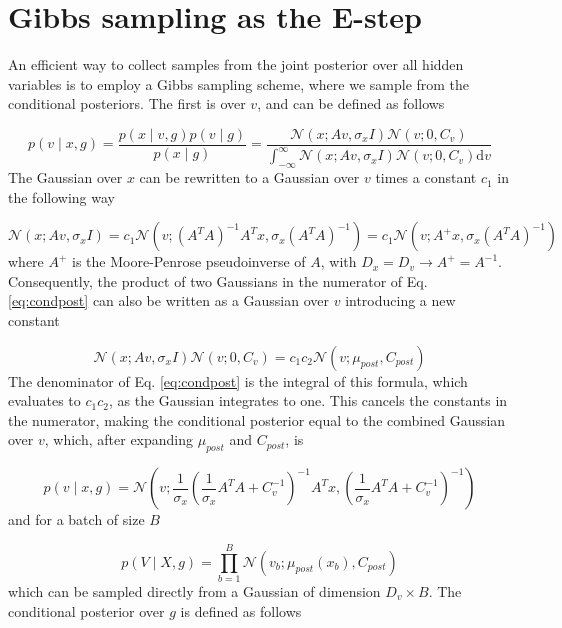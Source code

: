 \documentclass{paper}
\begin{document}
\section{Gibbs sampling as the E-step} \label{sec:estep}

An efficient way to collect samples from the joint posterior over all hidden variables is to employ a Gibbs sampling scheme, where we sample from the conditional posteriors. The first is over $v$, and can be defined as follows

\begin{equation} \label{eq:condpost}
p(v \mid x,g) = \frac{p(x \mid v,g) p(v \mid g)}{p(x \mid g)} = \frac{\mathcal{N}(x;Av,\sigma_x I) \mathcal{N}(v;0,C_v)}{\int_{-\infty}^{\infty} \mathcal{N}(x;Av,\sigma_x I) \mathcal{N}(v;0,C_v) \mathrm{d}v}
\end{equation}
%
The Gaussian over $x$ can be rewritten to a Gaussian over $v$ times a constant $c_1$ in the following way

\begin{equation} \label{eq:gauss_rewrite1}
\mathcal{N}(x;Av,\sigma_x I) = c_1 \mathcal{N}(v; (A^T A)^{-1} A^T x, \sigma_x (A^T A)^{-1}) = c_1 \mathcal{N}(v; A^{+} x, \sigma_x (A^T A)^{-1})
\end{equation}
%
where $A^{+}$ is the Moore-Penrose pseudoinverse of $A$, with $D_x = D_v \rightarrow A^{+} = A^{-1}$. Consequently, the product of two Gaussians in the numerator of Eq. \ref{eq:condpost} can also be written as a Gaussian over $v$ introducing a new constant

\begin{equation} \label{eq:gauss_rewrite2}
\mathcal{N}(x;Av,\sigma_x I) \mathcal{N}(v;0,C_v) = c_1 c_2 \mathcal{N}(v; \mu_{post},C_{post})
\end{equation}
%
The denominator of Eq. \ref{eq:condpost} is the integral of this formula, which evaluates to $c_1c_2$, as the Gaussian integrates to one. This cancels the constants in the numerator, making the conditional posterior equal to the combined Gaussian over $v$, which, after expanding $\mu_{post}$ and $C_{post}$, is

\begin{equation}
p(v \mid x,g) = \mathcal{N}\left(v; \frac{1}{ \sigma_x} \left( \frac{1}{ \sigma_x} A^T A + C_v^{-1}\right)^{-1} A^T x, \left(\frac{1}{\sigma_x} A^T A + C_v^{-1}\right)^{-1}\right)
\end{equation}
%
and for a batch of size $B$

\begin{equation}
p(V \mid X,g) = \prod_{b=1}^B \mathcal{N} \left(v_b; \mu_{post}(x_b),C_{post} \right)
\end{equation}
%
which can be sampled directly from a Gaussian of dimension $D_v \times B$. The conditional posterior over $g$ is defined as follows
\end{document}

